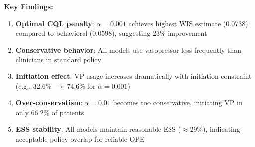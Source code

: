 \documentclass{article}
\begin{document}
\bigskip

\textbf{Key Findings:}
\begin{enumerate}
\item \textbf{Optimal CQL penalty}: $\alpha=0.001$ achieves highest WIS estimate (0.0738) compared to behavioral (0.0598), suggesting 23\% improvement
\item \textbf{Conservative behavior}: All models use vasopressor less frequently than clinicians in standard policy
\item \textbf{Initiation effect}: VP usage increases dramatically with initiation constraint (e.g., 32.6\% $\rightarrow$ 74.6\% for $\alpha=0.001$)
\item \textbf{Over-conservatism}: $\alpha=0.01$ becomes too conservative, initiating VP in only 66.2\% of patients
\item \textbf{ESS stability}: All models maintain reasonable ESS ($\approx$29\%), indicating acceptable policy overlap for reliable OPE
\end{enumerate}
\end{document}
